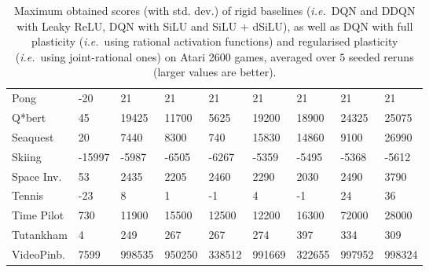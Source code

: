 \documentclass[accepted]{article}
\theoremstyle{plain}
\theoremstyle{definition}
\theoremstyle{remark}
\newcommand{\ie}{\emph{i.e.}~}
\begin{document}
\begin{table}[H]
{\begin{tabular}{@{}lllllllll@{}}
\multicolumn{1}{l|}{Pong}       & \multicolumn{1}{l|}{-20}    & 21                        & 21                       & \multicolumn{1}{l|}{21}     & \multicolumn{1}{l|}{21}     & 21                       & 21                       & 21                              \\
\multicolumn{1}{l|}{Q*bert}     & \multicolumn{1}{l|}{45}     & 19425                     & 11700                    & \multicolumn{1}{l|}{5625}   & \multicolumn{1}{l|}{19200}  & 18900                    & 24325                    & 25075                           \\
\multicolumn{1}{l|}{Seaquest}   & \multicolumn{1}{l|}{20}     & 7440                      & 8300                     & \multicolumn{1}{l|}{740}    & \multicolumn{1}{l|}{15830}  & 14860                    & 9100                     & 26990                           \\
\multicolumn{1}{l|}{Skiing}     & \multicolumn{1}{l|}{-15997} & -5987                     & -6505                    & \multicolumn{1}{l|}{-6267}  & \multicolumn{1}{l|}{-5359}  & -5495                    & -5368                    & -5612                           \\
\multicolumn{1}{l|}{Space Inv.} & \multicolumn{1}{l|}{53}     & 2435                      & 2205                     & \multicolumn{1}{l|}{2460}   & \multicolumn{1}{l|}{2290}   & 2030                     & 2490                     & 3790                            \\
\multicolumn{1}{l|}{Tennis}     & \multicolumn{1}{l|}{-23}    & 8                         & 1                        & \multicolumn{1}{l|}{-1}     & \multicolumn{1}{l|}{4}      & -1                       & 24                       & 36                              \\
\multicolumn{1}{l|}{Time Pilot} & \multicolumn{1}{l|}{730}    & 11900                     & 15500                    & \multicolumn{1}{l|}{12500}  & \multicolumn{1}{l|}{12200}  & 16300                    & 72000                    & 28000                           \\
\multicolumn{1}{l|}{Tutankham}  & \multicolumn{1}{l|}{4}      & 249                       & 267                      & \multicolumn{1}{l|}{267}    & \multicolumn{1}{l|}{274}    & 397                      & 334                      & 309                             \\
\multicolumn{1}{l|}{VideoPinb.} & \multicolumn{1}{l|}{7599}   & 998535                    & 950250                   & \multicolumn{1}{l|}{338512} & \multicolumn{1}{l|}{991669} & 322655                   & 997952                   & 998324                          \\ \bottomrule
\end{tabular}
}
\caption{Maximum obtained scores (with std. dev.) of rigid baselines (\ie DQN and DDQN with Leaky ReLU, DQN with SiLU and SiLU + dSiLU), as well as DQN with full plasticity (\ie using rational activation functions) and regularised plasticity (\ie using joint-rational ones) on Atari 2600 games, averaged over $5$ seeded reruns (larger values are better).}
\end{table}
\end{document}
